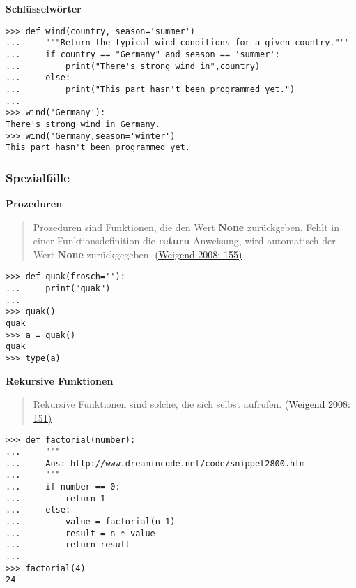 \vspace{0.5cm}\par\noindent\textbf{Schlüsselwörter}\vspace{0.5cm}

\begin{verbatim}
>>> def wind(country, season='summer')
...     """Return the typical wind conditions for a given country."""
...     if country == "Germany" and season == 'summer':
...         print("There's strong wind in",country)
...     else:
...         print("This part hasn't been programmed yet.")
...
>>> wind('Germany'):
There's strong wind in Germany.
>>> wind('Germany,season='winter')
This part hasn't been programmed yet.
\end{verbatim}



\subsubsection{\texorpdfstring{{Spezialfälle}}{Spezialfälle}}

\vspace{0.5cm}\par\noindent\textbf{Prozeduren}\vspace{0.5cm}

\begin{quote}
Prozeduren sind Funktionen, die den Wert \textbf{None} zurückgeben.
Fehlt in einer Funktionsdefinition die \textbf{return}-Anweisung, wird
automatisch der Wert \textbf{None} zurückgegeben.
\href{http://bibliography.lingpy.org?key=Weigend2008}{(Weigend 2008:
155)}
\end{quote}

\begin{verbatim}
>>> def quak(frosch=''):
...     print("quak")
...
>>> quak()
quak
>>> a = quak()
quak
>>> type(a)
\end{verbatim}



\vspace{0.5cm}\par\noindent\textbf{Rekursive Funktionen}\vspace{0.5cm}

\begin{quote}
Rekursive Funktionen sind solche, die sich selbst aufrufen.
\href{http://bibliography.lingpy.org?key=Weigend2008}{(Weigend 2008:
151)}
\end{quote}

\begin{verbatim}
>>> def factorial(number):
...     """
...     Aus: http://www.dreamincode.net/code/snippet2800.htm
...     """
...     if number == 0:
...         return 1
...     else:
...         value = factorial(n-1)
...         result = n * value
...         return result
...
>>> factorial(4)
24
\end{verbatim}



